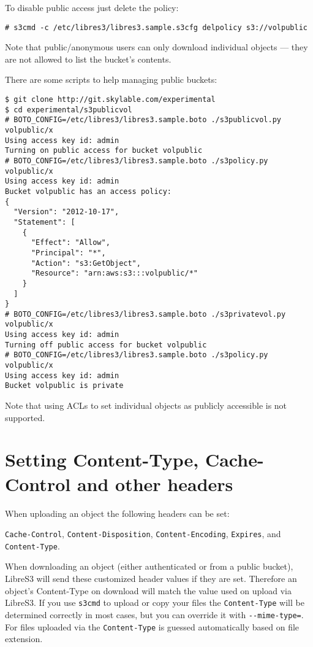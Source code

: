 To disable public access just delete the policy:

\begin{lstlisting}
# s3cmd -c /etc/libres3/libres3.sample.s3cfg delpolicy s3://volpublic
\end{lstlisting}

Note that public/anonymous users can only download individual objects ---
they are not allowed to list the bucket's contents.

There are some scripts to help managing public buckets:
\begin{lstlisting}
$ git clone http://git.skylable.com/experimental
$ cd experimental/s3publicvol
# BOTO_CONFIG=/etc/libres3/libres3.sample.boto ./s3publicvol.py volpublic/x
Using access key id: admin
Turning on public access for bucket volpublic
# BOTO_CONFIG=/etc/libres3/libres3.sample.boto ./s3policy.py volpublic/x
Using access key id: admin
Bucket volpublic has an access policy:
{
  "Version": "2012-10-17",
  "Statement": [
    {
      "Effect": "Allow",
      "Principal": "*",
      "Action": "s3:GetObject",
      "Resource": "arn:aws:s3:::volpublic/*"
    }
  ]
}
# BOTO_CONFIG=/etc/libres3/libres3.sample.boto ./s3privatevol.py volpublic/x
Using access key id: admin
Turning off public access for bucket volpublic
# BOTO_CONFIG=/etc/libres3/libres3.sample.boto ./s3policy.py volpublic/x
Using access key id: admin
Bucket volpublic is private
\end{lstlisting}

Note that using ACLs to set individual objects as publicly accessible
is not supported.

\section{Setting Content-Type, Cache-Control and other headers}
\label{sec:setting-headers}
When uploading an object the following headers can be set:

\verb|Cache-Control|, \verb|Content-Disposition|, \verb|Content-Encoding|,
\verb|Expires|, and \verb|Content-Type|.

When downloading an object (either authenticated or from a public bucket),
LibreS3 will send these customized header values if they are set.
Therefore an object's Content-Type on download will match the value used on upload
via LibreS3.
If you use \verb|s3cmd| to upload or copy your files the \verb|Content-Type|
will be determined correctly in most cases, but you can override it with
\verb|--mime-type=|.
For files uploaded via \SX the \verb|Content-Type| is guessed automatically based on
file extension.

